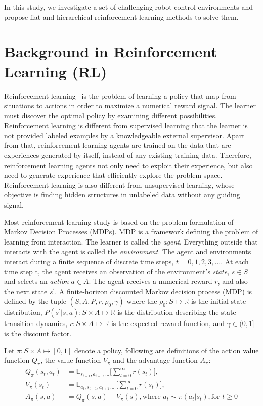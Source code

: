 In this study, we investigate a set of challenging robot control environments and propose flat and hierarchical reinforcement learning methods to solve them.
\section{Background in Reinforcement Learning (RL)}
Reinforcement learning~\cite{sutton1998reinforcement} is the problem of learning a policy that map from situations to actions in order to maximize a numerical reward signal. The learner must discover the optimal policy by examining different possibilities. Reinforcement learning is different from supervised learning that the learner is not provided labeled examples by a knowledgeable external supervisor. Apart from that, reinforcement learning agents are trained on the data that are experiences generated by itself, instead of any existing training data. Therefore, reinforcement learning agents not only need to exploit their experience, but also need to generate experience that efficiently explore the problem space.  Reinforcement learning is also different from unsupervised learning, whose objective is finding hidden structures in unlabeled data without any guiding signal.

Most reinforcement learning study is based on the problem formulation of Markov Decision Processes (MDPs). MDP is a framework defining the problem of learning from interaction. The learner is called the \textit{agent}. Everything outside that interacts with the agent is called the \textit{environment}.
The agent and environments interact during a finite sequence of discrete time steps, $t=0,1,2,3,...$. At each time step t, the agent receives an observation of the environment's \textit{state}, $s \in S$ and selects an \textit{action} $a \in A$. The agent receives a numerical reward $r$, and also the next state $s^\prime$.  A finite-horizon discounted Markov decision process (MDP) is defined by the tuple $(S,A,P,r,\rho_0,\gamma) $ where the $\rho_0 : S \mapsto \mathbb{R}$ is the initial state distribution, $P(s^\prime|s,a) : S \times A \mapsto \mathbb{R}$ is the distribution describing the state transition dynamics, $r : S \times A \mapsto \mathbb{R}$ is the expected reward function, and $\gamma \in (0,1]$ is the discount factor.

Let $\pi : S \times A \mapsto [0,1] $ denote a policy, following are definitions of the action value function $Q_\pi $, the value function $V_\pi $ and the advantage function $A_\pi $:
\begin{align}
Q_\pi(s_t,a_t) &= \mathbb{E}_{s_{t+1},a_{t+1},\ldots}
\big[ \sum_{l=0}^\infty r(s_{t}) \big], \\
V_\pi(s_t) &= \mathbb{E}_{a_{t},s_{t+1},a_{t+1},\ldots}
\big[ \sum_{l=0}^\infty r(s_{t}) \big],\\
A_\pi (s,a) &= Q_\pi (s,a) - V_\pi (s), \text{where } a_t \sim \pi (a_t|s_t), \text{for } t \geq 0 
\end{align}


